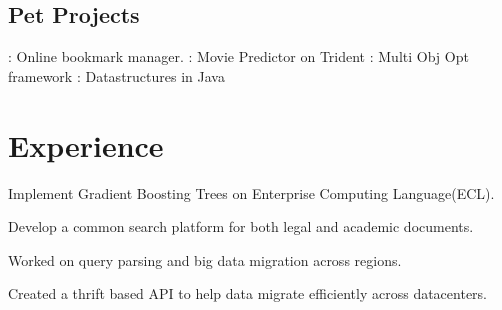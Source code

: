 \documentclass[]{bigfatnoob-resume}
\begin{document}
\begin{minipage}[t]{0.33\textwidth}
\subsection{Pet Projects}
\href{http://region.io}{}: Online bookmark manager.
\href{https://github.com/NCSU-Advanced-Algos/octorater}{}: Movie Predictor on Trident
\href{https://github.com/bigfatnoob/optima}{}: Multi Obj Opt framework
\href{https://github.com/dr-bigfatnoob/collections}{}: Datastructures in Java


%
%

\end{minipage} 
\hfill
\begin{minipage}[t]{0.66\textwidth} 


\section{Experience}

\vspace{\topsep} %
\begin{tightemize}
	\item Implement Gradient Boosting Trees on Enterprise Computing Language(ECL).
	\item Develop a common search platform for both legal and academic documents.
\end{tightemize}
\sectionsep

\vspace{\topsep} %
\begin{tightemize}
	\item Worked on query parsing and big data migration across regions.
	\item Created a thrift based API to help data migrate efficiently across datacenters.
\end{tightemize}
\sectionsep


\end{minipage}
\end{document}
